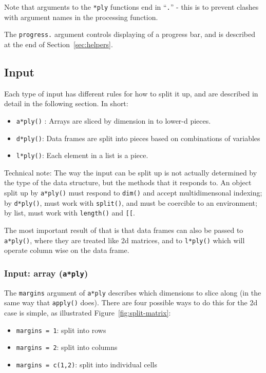 \documentclass{scrartcl}
\newcommand{\code}[1]{\lstinline!#1!}
\newcommand{\f}[1]{\lstinline!#1()!}
\begin{document}
Note that arguments to the {\tt **ply} functions end in  ``{\tt .}'' - this is to prevent clashes with argument names in the processing function.

The {\tt progress.} argument controls displaying of a progress bar, and is described at the end of Section~\ref{sec:helpers}.

\subsection{Input} 
\label{sec:input}

Each type of input has different rules for how to split it up, and are described in detail in the following section. In short:

\begin{itemize}
  \item \f{a*ply} : Arrays are sliced by dimension in to lower-d pieces. 
  
  \item \f{d*ply}: Data frames are split into pieces based on combinations of variables
  
  \item \f{l*ply}: Each element in a list is a piece.
  
\end{itemize}

Technical note: The way the input can be split up is not actually determined by the type of the data structure, but the methods that it responds to.  An object split up by \f{a*ply} must respond to \f{dim} and accept multidimensonal indexing; by \f{d*ply}, must work with \f{split}, and must be coercible to an environment; by list, must work with \f{length} and \code{[[}.

The most important result of that is that data frames can also be passed to \f{a*ply}, where they are treated like 2d matrices, and to \f{l*ply} which will operate column wise on the data frame.

\subsubsection{Input: array ({\tt a*ply})}

The {\tt margins} argument of {\tt a*ply} describes which dimensions to slice along (in the same way that \f{apply} does).  There are four possible ways to do this for the 2d case is simple, as illustrated Figure~\ref{fig:split-matrix}:

\begin{itemize}
  \item \code{margins = 1}: split into rows
  \item \code{margins = 2}: split into columns
  \item \code{margins = c(1,2)}: split into individual cells
\end{itemize}
\end{document}
